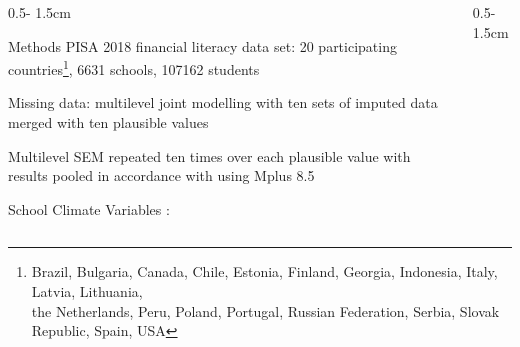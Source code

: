 \documentclass{uioposter}
\begin{document}
\begin{frame}
\begin{columns}[onlytextwidth]
\begin{column}{0.5\textwidth - 1.5cm}


    \begin{block}{Methods}
        PISA 2018 financial literacy data set: 20 participating countries\footnote{Brazil, Bulgaria, Canada, Chile, Estonia, Finland, Georgia, Indonesia, Italy, Latvia, Lithuania,\\the Netherlands, Peru, Poland, Portugal, Russian Federation, Serbia, Slovak Republic, Spain, USA}, 6631 schools, 107162 students

        Missing data: multilevel joint modelling \parencite{asparouhov:2010} with ten sets of imputed data merged with ten plausible values

        Multilevel SEM repeated ten times over each plausible value with results pooled in accordance with \textcite{rubin:1987} using Mplus 8.5

        School Climate Variables \parencite{wang:2016}:
        \vspace{-1cm}\small
        
    \end{block}

\end{column}

\begin{column}{0.5\textwidth - 1.5cm}


\end{column}
\end{columns}
\end{frame}
\end{document}
